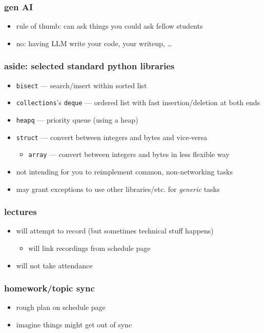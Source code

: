 \begin{frame}\frametitle{gen AI}
    \begin{itemize}
    \item rule of thumb: can ask things you could ask fellow students
    \vspace{.5cm}
    \item no: having LLM write your code, your writeup, \ldots
    \end{itemize}
\end{frame}

\begin{frame}\frametitle{aside: selected standard python libraries}
    \begin{itemize}
    \item \texttt{bisect} --- search/insert within sorted list
    \item \texttt{collections}'s \texttt{deque} --- ordered list with fast insertion/deletion at both ends
    \item \texttt{heapq} --- priority queue (using a heap)
    \item \texttt{struct} --- convert between integers and bytes and vice-versa
        \begin{itemize}
        \item \texttt{array} --- convert between integers and bytes in less flexible way
        \end{itemize}
    \vspace{.5cm}
    \item not intending for you to reimplement common, non-networking tasks
    \item may grant exceptions to use other libraries/etc. for \textit{generic} tasks
    \end{itemize}
\end{frame}

\begin{frame}\frametitle{lectures}
    \begin{itemize}
    \item will attempt to record (but sometimes technical stuff happens)
        \begin{itemize}
        \item will link recordings from schedule page
        \end{itemize}
    \item will not take attendance
    \end{itemize}
\end{frame}

\begin{frame}\frametitle{homework/topic sync}
    \begin{itemize}
    \item rough plan on schedule page
    \item imagine things might get out of sync
    \end{itemize}
\end{frame}
